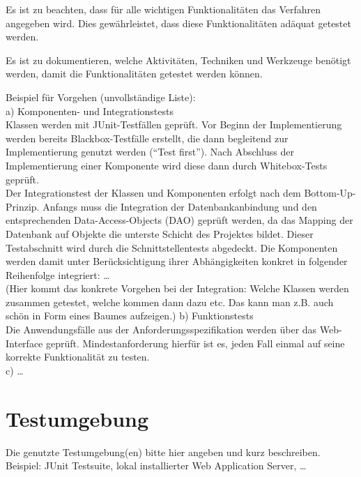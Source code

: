 Es ist zu beachten, dass für alle wichtigen Funktionalitäten das Verfahren
angegeben wird. Dies gewährleistet, dass diese Funktionalitäten adäquat
getestet werden.

Es ist zu dokumentieren, welche Aktivitäten, Techniken und Werkzeuge benötigt
werden, damit die Funktionalitäten getestet werden können.

Beispiel für Vorgehen (unvollständige Liste):\\
a) Komponenten- und Integrationstests\\
Klassen werden mit JUnit-Testfällen geprüft. Vor Beginn der Implementierung
werden bereits Blackbox-Testfälle erstellt, die dann begleitend zur
Implementierung genutzt werden ("`Test first"'). Nach Abschluss der
Implementierung einer Komponente wird diese dann durch Whitebox-Tests
geprüft.\\
Der Integrationstest der Klassen und Komponenten erfolgt nach dem
Bottom-Up-Prinzip. Anfangs muss die Integration der Datenbankanbindung und den
entsprechenden Data-Access-Objects (DAO) geprüft werden, da das Mapping der
Datenbank auf Objekte die unterste Schicht des Projektes bildet. Dieser
Testabschnitt wird durch die Schnittstellentests abgedeckt.
Die Komponenten werden damit unter Berücksichtigung ihrer Abhängigkeiten
konkret in folgender Reihenfolge integriert: \ldots\\
(Hier kommt das konkrete Vorgehen bei der Integration: Welche Klassen werden
zusammen getestet, welche kommen dann dazu etc. Das kann man z.B. auch schön in
Form eines Baumes aufzeigen.)
b) Funktionstests\\
Die Anwendungsfälle aus der Anforderungsspezifikation werden über das
Web-Interface geprüft. Mindestanforderung hierfür ist es, jeden Fall einmal auf
seine korrekte Funktionalität zu testen.\\
c) \ldots

\section{Testumgebung}
Die genutzte Testumgebung(en) bitte hier angeben und kurz beschreiben.\\
Beispiel: JUnit Testsuite, lokal installierter Web Application Server, \ldots

